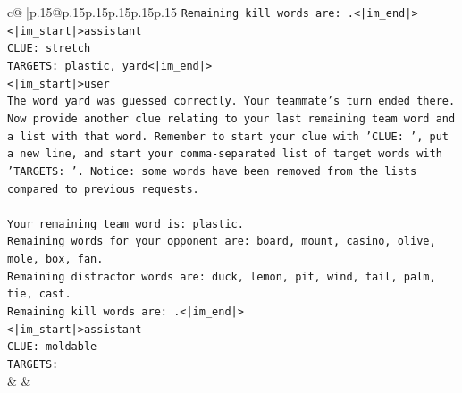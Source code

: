 \documentclass{article}
\begin{document}
{\begin{supertabular}{c@{$\;$}|p{.15\linewidth}@{}p{.15\linewidth}p{.15\linewidth}p{.15\linewidth}p{.15\linewidth}p{.15\linewidth}}
{{{\texttt{Remaining kill words are: .<|im\_end|>} \\
\texttt{<|im\_start|>assistant} \\
\texttt{CLUE: stretch} \\
\texttt{TARGETS: plastic, yard<|im\_end|>} \\
\texttt{<|im\_start|>user} \\
\texttt{The word yard was guessed correctly. Your teammate's turn ended there.} \\
\texttt{Now provide another clue relating to your last remaining team word and a list with that word. Remember to start your clue with 'CLUE: ', put a new line, and start your comma{-}separated list of target words with 'TARGETS: '. Notice: some words have been removed from the lists compared to previous requests.} \\
\\ 
\texttt{Your remaining team word is: plastic.} \\
\texttt{Remaining words for your opponent are: board, mount, casino, olive, mole, box, fan.} \\
\texttt{Remaining distractor words are: duck, lemon, pit, wind, tail, palm, tie, cast.} \\
\texttt{Remaining kill words are: .<|im\_end|>} \\
\texttt{<|im\_start|>assistant} \\
\texttt{CLUE: moldable} \\
\texttt{TARGETS:} \\
            }
        }
    }
    & & \\ \\


\end{supertabular}}
\end{document}
